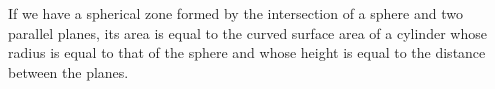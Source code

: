 If we have a spherical zone formed by the intersection of a sphere and two parallel
planes, its area is equal to the curved surface area of a cylinder whose radius
is equal to that of the sphere and whose height is equal to the distance between
the planes.